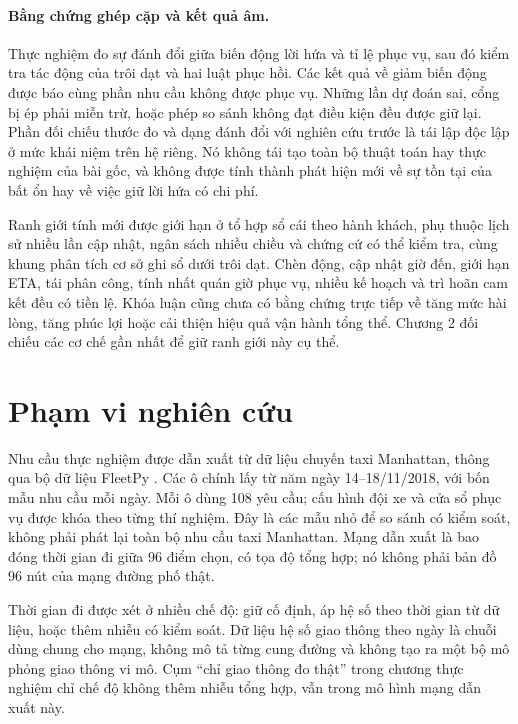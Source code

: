 \paragraph{Bằng chứng ghép cặp và kết quả âm.}
Thực nghiệm đo sự đánh đổi giữa biến động lời hứa và tỉ lệ phục vụ, sau đó kiểm tra tác động
của trôi dạt và hai luật phục hồi. Các kết quả về giảm biến động được báo cùng phần nhu cầu
không được phục vụ. Những lần dự đoán sai, cổng bị ép phải miễn trừ, hoặc phép so sánh không
đạt điều kiện đều được giữ lại. Phần đối chiếu thước đo và dạng đánh đổi với nghiên cứu
trước là tái lập độc lập ở mức khái niệm trên hệ riêng. Nó không tái tạo toàn bộ thuật toán
hay thực nghiệm của bài gốc, và không được tính thành phát hiện mới về sự tồn tại của bất
ổn hay về việc giữ lời hứa có chi phí.

Ranh giới tính mới được giới hạn ở tổ hợp sổ cái theo hành khách, phụ thuộc lịch sử nhiều
lần cập nhật, ngân sách nhiều chiều và chứng cứ có thể kiểm tra, cùng khung phân tích cơ sở
ghi sổ dưới trôi dạt. Chèn động, cập nhật giờ đến, giới hạn ETA, tái phân công, tính nhất quán
giờ phục vụ, nhiều kế hoạch và trì hoãn cam kết đều có tiền lệ. Khóa luận cũng chưa có bằng
chứng trực tiếp về tăng mức hài lòng, tăng phúc lợi hoặc cải thiện hiệu quả vận hành tổng thể.
Chương 2 đối chiếu các cơ chế gần nhất để giữ ranh giới này cụ thể.

\section{Phạm vi nghiên cứu}

Nhu cầu thực nghiệm được dẫn xuất từ dữ liệu chuyến taxi Manhattan, thông qua bộ dữ liệu
FleetPy \cite{fleetpy2026}. Các ô chính lấy từ năm ngày 14--18/11/2018, với bốn mẫu nhu cầu mỗi ngày. Mỗi ô
dùng 108 yêu cầu; cấu hình đội xe và cửa sổ phục vụ được khóa theo từng thí nghiệm.
Đây là các mẫu nhỏ để so sánh có kiểm soát, không phải phát lại toàn bộ nhu cầu taxi
Manhattan. Mạng dẫn xuất là bao đóng thời gian đi giữa 96 điểm chọn, có tọa độ tổng hợp;
nó không phải bản đồ 96 nút của mạng đường phố thật.

Thời gian đi được xét ở nhiều chế độ: giữ cố định, áp hệ số theo thời gian từ dữ liệu,
hoặc thêm nhiễu có kiểm soát. Dữ liệu hệ số giao thông theo ngày là chuỗi dùng chung cho
mạng, không mô tả từng cung đường và không tạo ra một bộ mô phỏng giao thông vi mô. Cụm
``chỉ giao thông đo thật'' trong chương thực nghiệm chỉ chế độ không thêm nhiễu tổng hợp,
vẫn trong mô hình mạng dẫn xuất này.

